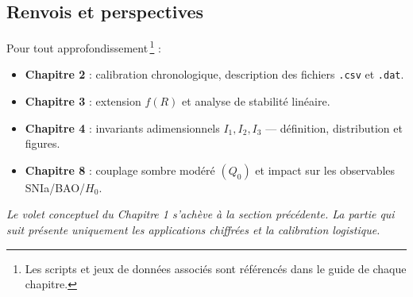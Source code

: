\subsection{Renvois et perspectives}\label{sec:renvois}

Pour tout approfondissement\,\footnote{%
Les scripts et jeux de données associés sont référencés dans le
guide de chaque chapitre.} :
\begin{itemize}
  \item \textbf{Chapitre 2} : calibration chronologique, description des fichiers \texttt{.csv} et \texttt{.dat}.
  \item \textbf{Chapitre 3} : extension \(f(R)\) et analyse de stabilité linéaire.
  \item \textbf{Chapitre 4} : invariants adimensionnels \(I_{1},I_{2},I_{3}\) — définition, distribution et figures.
  \item \textbf{Chapitre 8} : couplage sombre modéré \((Q_{0})\) et impact sur les observables SNIa/BAO/\(H_{0}\).
\end{itemize}

\smallskip
\noindent\emph{Le volet conceptuel du Chapitre 1 s’achève à la section précédente. La partie qui suit présente uniquement les applications chiffrées et la calibration logistique.}